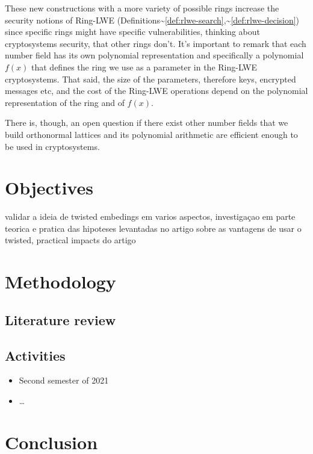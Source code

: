 \documentclass[a4paper,12pt]{article}
\begin{document}
These new constructions with a more variety of possible rings increase the security notions of Ring-LWE (Definitions\textasciitilde{}\ref{def:rlwe-search},\textasciitilde{}\ref{def:rlwe-decision}) since specific rings might have specific vulnerabilities, thinking about cryptosystems security, that other rings don't. It's important to remark that each number field has its own polynomial representation and specifically a polynomial \(f(x)\) that defines the ring we use as a parameter in the Ring-LWE cryptosystems. That said, the size of the parameters, therefore keys, encrypted messages etc, and the cost of the Ring-LWE operations depend on the polynomial representation of the ring and of \(f(x)\).

There is, though, an open question if there exist other number fields that we build orthonormal lattices and its polynomial arithmetic are efficient enough to be used in cryptosystems.

\section{Objectives}
\label{sec:org6cc2125}
validar a ideia de twisted embedings em varios aspectos, investigaçao em parte teorica e pratica das hipoteses levantadas no artigo sobre as vantagens de usar o twisted, practical impacts do artigo
\section{Methodology}
\label{sec:orgde42caf}
\subsection{Literature review}
\label{sec:org7963dcc}
\subsection{Activities}
\label{sec:orgf058e06}
\begin{itemize}
\item Second semester of 2021
\item \ldots{}
\end{itemize}
\section{Conclusion}
\label{sec:org6c55878}



\end{document}
